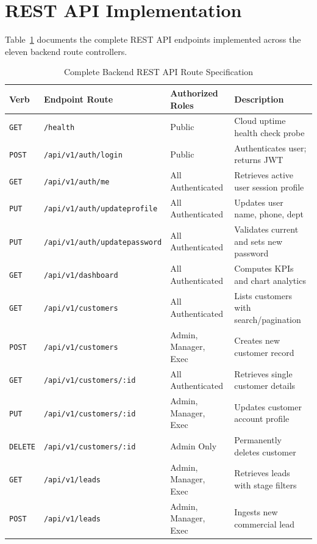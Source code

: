 \section{REST API Implementation}
Table~\ref{tab:api_endpoints} documents the complete REST API endpoints implemented across the eleven backend route controllers.

\begin{table}[h!]
\centering
\caption{Complete Backend REST API Route Specification}
\label{tab:api_endpoints}
\renewcommand{\arraystretch}{1.2}
\begin{tabular}{|p{1.5cm}|p{5.5cm}|p{3.5cm}|p{4cm}|}
\hline
\textbf{Verb} & \textbf{Endpoint Route} & \textbf{Authorized Roles} & \textbf{Description} \\ \hline
\texttt{GET} & \texttt{/health} & Public & Cloud uptime health check probe \\ \hline
\texttt{POST} & \texttt{/api/v1/auth/login} & Public & Authenticates user; returns JWT \\ \hline
\texttt{GET} & \texttt{/api/v1/auth/me} & All Authenticated & Retrieves active user session profile \\ \hline
\texttt{PUT} & \texttt{/api/v1/auth/updateprofile} & All Authenticated & Updates user name, phone, dept \\ \hline
\texttt{PUT} & \texttt{/api/v1/auth/updatepassword} & All Authenticated & Validates current and sets new password \\ \hline
\texttt{GET} & \texttt{/api/v1/dashboard} & All Authenticated & Computes KPIs and chart analytics \\ \hline
\texttt{GET} & \texttt{/api/v1/customers} & All Authenticated & Lists customers with search/pagination \\ \hline
\texttt{POST} & \texttt{/api/v1/customers} & Admin, Manager, Exec & Creates new customer record \\ \hline
\texttt{GET} & \texttt{/api/v1/customers/:id} & All Authenticated & Retrieves single customer details \\ \hline
\texttt{PUT} & \texttt{/api/v1/customers/:id} & Admin, Manager, Exec & Updates customer account profile \\ \hline
\texttt{DELETE}& \texttt{/api/v1/customers/:id} & Admin Only & Permanently deletes customer \\ \hline
\texttt{GET} & \texttt{/api/v1/leads} & Admin, Manager, Exec & Retrieves leads with stage filters \\ \hline
\texttt{POST} & \texttt{/api/v1/leads} & Admin, Manager, Exec & Ingests new commercial lead \\ \hline

\end{tabular}
\end{table}
